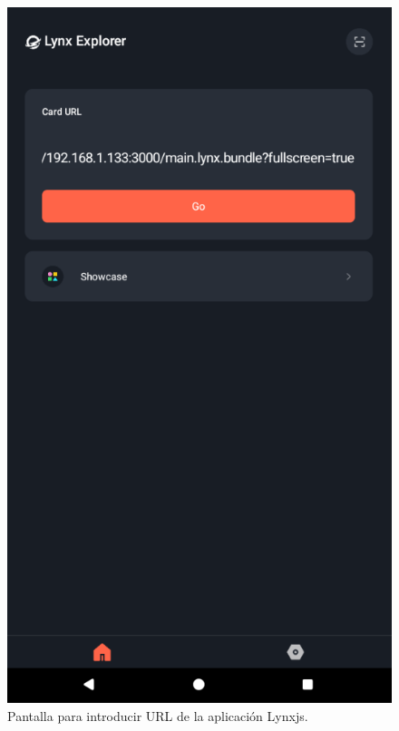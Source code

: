 \begin{figure}[h]
  \centering
  \begin{minipage}[t]{0.3\textwidth}
    \centering
    \includegraphics[width=\textwidth]{assets/lynx-application-url.png}
    \caption{Pantalla para introducir URL de la aplicación Lynxjs.}
    \label{fig:lynx-application-url}
  \end{minipage}
  \hfill
  \begin{minipage}[t]{0.3\textwidth}

\end{minipage}
\end{figure}

